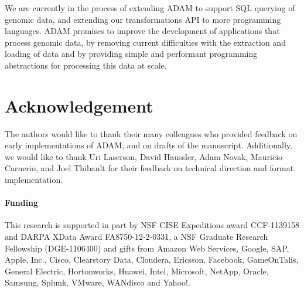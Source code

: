 \documentclass{bioinfo}
\begin{document}
We are currently in the process of extending ADAM to support SQL querying of genomic data, and extending our transformations API to more programming languages. 
ADAM promises to improve the development of applications that process genomic data, by removing current difficulties with the extraction and loading of data and by
providing simple and performant programming abstractions for processing this data at scale.

\section*{Acknowledgement}
\label{sec:acknowledgement}

The authors would like to thank their many colleagues who provided feedback on early implementations of ADAM, and on drafts of the manuscript. Additionally, we would
like to thank Uri Laserson, David Haussler, Adam Novak, Mauricio Carnerio, and Joel Thibault for their feedback on technical direction and format implementation.

\paragraph{Funding\textcolon}
\label{sec:funding}

This research is supported in part by NSF CISE Expeditions award CCF-1139158 and DARPA XData Award FA8750-12-2-0331, a NSF
Graduate Research Fellowship (DGE-1106400) and gifts from Amazon Web Services, Google, SAP,  Apple, Inc., Cisco, Clearstory Data,
Cloudera, Ericsson, Facebook, GameOnTalis, General Electric, Hortonworks, Huawei, Intel, Microsoft, NetApp, Oracle, Samsung, Splunk,
VMware, WANdisco and Yahoo!.




\end{document}
